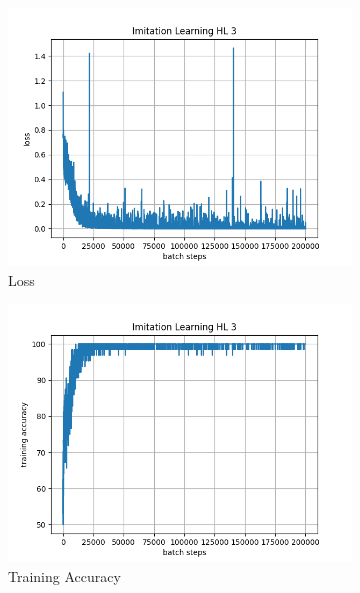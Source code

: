 \documentclass[10pt]{scrartcl}
\begin{document}
\begin{figure}[h]
    \begin{subfigure}{0.5\textwidth}
      \centering
      \includegraphics[width=\linewidth]{images/Il_hl3_loss.png}
      \caption{Loss}
      \label{fig:Il_hl3_loss}
    \end{subfigure} 
    \begin{subfigure}{0.5\textwidth}
      \centering
      \includegraphics[width=\linewidth]{images/Il_hl3_train.png}
      \caption{Training Accuracy}
      \label{fig:Il_hl3_train}
    \end{subfigure} \\
    \begin{subfigure}{0.5\textwidth}
      \centering

\end{subfigure}
\end{figure}
\end{document}
